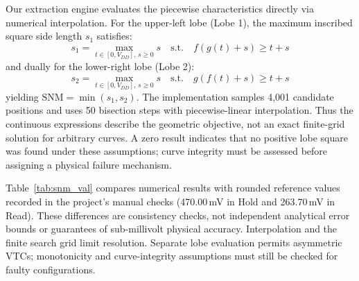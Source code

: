 \documentclass[conference]{IEEEtran}
\begin{document}
Our extraction engine evaluates the piecewise characteristics directly via numerical interpolation. For the upper-left lobe (Lobe 1), the maximum inscribed square side length $s_1$ satisfies:
\begin{equation}
s_1 = \max_{t \in [0, V_{DD}], \, s \ge 0} s \quad \text{s.t.} \quad f(g(t) + s) \ge t + s
\label{eq:snm_lobe1}
\end{equation}
and dually for the lower-right lobe (Lobe 2):
\begin{equation}
s_2 = \max_{t \in [0, V_{DD}], \, s \ge 0} s \quad \text{s.t.} \quad g(f(t) + s) \ge t + s
\label{eq:snm_lobe2}
\end{equation}
yielding $\mathrm{SNM}=\min(s_1,s_2)$. The implementation samples 4,001 candidate positions and uses 50 bisection steps with piecewise-linear interpolation. Thus the continuous expressions describe the geometric objective, not an exact finite-grid solution for arbitrary curves. A zero result indicates that no positive lobe square was found under these assumptions; curve integrity must be assessed before assigning a physical failure mechanism.

Table~\ref{tab:snm_val} compares numerical results with rounded reference values recorded in the project's manual checks (470.00\,mV in Hold and 263.70\,mV in Read). These differences are consistency checks, not independent analytical error bounds or guarantees of sub-millivolt physical accuracy. Interpolation and the finite search grid limit resolution. Separate lobe evaluation permits asymmetric VTCs; monotonicity and curve-integrity assumptions must still be checked for faulty configurations.

\begin{table}[t]
\centering
\caption{SNM Extraction Consistency with Recorded Reference Values}
\label{tab:snm_val}
\end{table}

\end{document}
